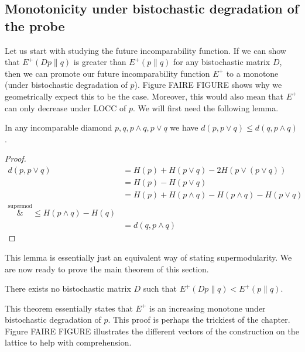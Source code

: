 \subsection{Monotonicity under bistochastic degradation of the probe} \label{sec:p_monotonicity}

Let us start with studying the future incomparability function. If we can show that $E^+(Dp \parallel q)$ is greater than $E^+(p \parallel q)$ for any bistochastic matrix $D$, then we can promote our future incomparability function $E^+$ to a monotone (under bistochastic degradation of $p$). Figure FAIRE FIGURE shows why we geometrically expect this to be the case. Moreover, this would also mean that $E^+$ can only decrease under LOCC of $p$. We will first need the following lemma.

\begin{lemma} \label{lem:incomparable_diamond}
    In any incomparable diamond $p, q, p \wedge q, p \vee q$ we have $d(p, p \vee q) \leq d(q, p \wedge q)$.
\end{lemma}

\begin{proof}
    \begin{align}
        d(p, p \vee q) &= H(p) + H(p \vee q) - 2H(p \vee (p \vee q))\\
        &= H(p) - H(p \vee q)\\
        &= H(p) + H(p \wedge q) - H(p \wedge q) - H(p \vee q)\\
        \overset{\text{supermod}}&{\leq} H(p \wedge q) - H(q)\\
        &= d(q, p \wedge q)
    \end{align} \phantom{\qedhere}
\end{proof}

This lemma is essentially just an equivalent way of stating supermodularity. We are now ready to prove the main theorem of this section.

\begin{theorem} \label{th:monotone_future_p}
    There exists no bistochastic matrix $D$ such that $E^+ (Dp \parallel q) < E^+ (p \parallel q)$.
\end{theorem}

This theorem essentially states that $E^+$ is an increasing monotone under bistochastic degradation of $p$. This proof is perhaps the trickiest of the chapter. Figure FAIRE FIGURE illustrates the different vectors of the construction on the lattice to help with comprehension.

